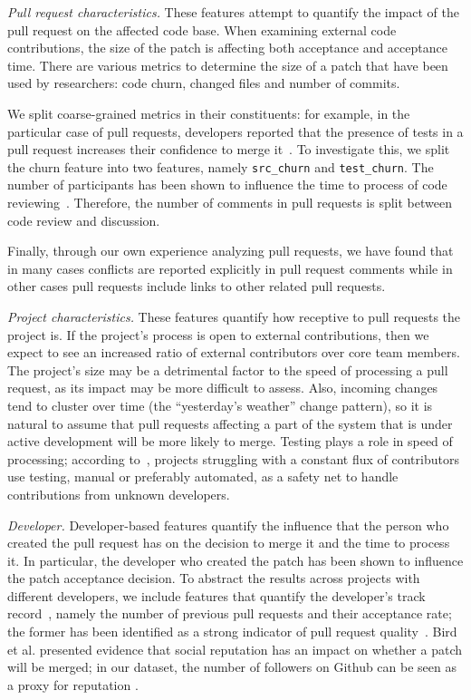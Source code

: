 \documentclass{sig-alternate}
\begin{document}
  \emph{Pull request characteristics.} These features attempt to quantify the
  impact of the pull request on the affected code base. When examining external
  code contributions, the size of the patch is affecting both acceptance and
  acceptance time. There are various metrics to determine the size of a patch
  that have been used by researchers: code churn, changed files and number of
  commits. 

  We split coarse-grained metrics in their constituents: for example,
  in the particular case of pull requests, developers reported that
  the presence of tests in a pull request increases their confidence to merge
  it~\cite{Pham13}. To investigate this, we split the churn feature into two
  features, namely \texttt{src\_churn} and \texttt{test\_churn}. The number of
  participants  has been shown to influence the time to process  of code
  reviewing~\cite{Rigby13}. Therefore, the number of comments in pull requests
  is split between code review and discussion. 

  Finally, through our own experience analyzing pull
  requests, we have found that in many cases conflicts are reported explicitly
  in pull request comments while in other cases pull requests include links to
  other related pull requests.

  \emph{Project characteristics.} These features quantify how receptive to pull
  requests the project is. If the project's process is open to external
  contributions, then we expect to see an increased ratio of external
  contributors over core team members. The project's size may be a detrimental
  factor to the speed of processing a pull request, as its impact may be more
  difficult to assess. Also, incoming changes tend to cluster over time (the
  ``yesterday's weather'' change pattern), so it is natural to
  assume that pull requests affecting a part of the system that is under active
  development will be more likely to merge. Testing plays a role in speed of
  processing; according to~\cite{Pham13}, projects struggling with a constant
  flux of contributors use testing, manual or preferably automated, as a safety
  net to handle contributions from unknown developers.

  \emph{Developer.}  Developer-based features quantify the influence that the
  person who created the pull request has on the decision to merge it and the
  time to process it. In particular, the developer who created the patch has
  been shown to influence the patch acceptance decision. To
  abstract the results across projects with different developers, we include
  features that quantify the developer's track record~\cite{Dabbi12}, namely the
  number of previous pull requests and their acceptance rate; the former has
  been identified as a strong indicator of pull request quality~\cite{Pham13}.
  Bird et al.  presented evidence that social reputation has an
  impact on whether a patch will be merged; in our dataset, the number of
  followers on Github can be seen as a proxy for reputation .
\end{document}

